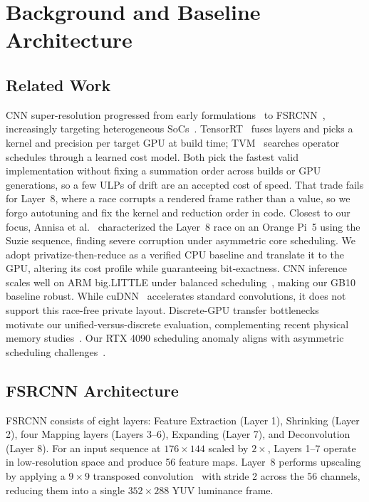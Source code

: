 \documentclass[conference]{IEEEtran}
\begin{document}
\section{Background and Baseline Architecture}

\subsection{Related Work}
CNN super-resolution progressed from early formulations~\cite{dong2014srcnn} to FSRCNN~\cite{dong2016fsrcnn}, increasingly targeting heterogeneous SoCs~\cite{nvidiagracehopper2022,wahlgren2025upm}. TensorRT~\cite{nvidiatensorrt} fuses layers and picks a kernel and precision per target GPU at build time; TVM~\cite{chen2018tvm} searches operator schedules through a learned cost model. Both pick the fastest valid implementation without fixing a summation order across builds or GPU generations, so a few ULPs of drift are an accepted cost of speed. That trade fails for Layer~8, where a race corrupts a rendered frame rather than a value, so we forgo autotuning and fix the kernel and reduction order in code. Closest to our focus, Annisa et al.~\cite{annisa2025} characterized the Layer~8 race on an Orange Pi~5 using the Suzie sequence, finding severe corruption under asymmetric core scheduling. We adopt privatize-then-reduce as a verified CPU baseline and translate it to the GPU, altering its cost profile while guaranteeing bit-exactness. CNN inference scales well on ARM big.LITTLE under balanced scheduling~\cite{wang2020pipeit}, making our GB10 baseline robust. While cuDNN~\cite{chetlur2014cudnn} accelerates standard convolutions, it does not support this race-free private layout. Discrete-GPU transfer bottlenecks~\cite{go2017apunet} motivate our unified-versus-discrete evaluation, complementing recent physical memory studies~\cite{wahlgren2025upm}. Our RTX 4090 scheduling anomaly aligns with asymmetric scheduling challenges~\cite{bilbao2023pmcsched,eichenberger2012ompaffinity}.

\subsection{FSRCNN Architecture}
FSRCNN consists of eight layers: Feature Extraction (Layer 1), Shrinking (Layer 2), four Mapping layers (Layers 3--6), Expanding (Layer 7), and Deconvolution (Layer 8). For an input sequence at $176{\times}144$ scaled by $2\times$, Layers 1--7 operate in low-resolution space and produce 56 feature maps. Layer~8 performs upscaling by applying a $9{\times}9$ transposed convolution~\cite{dumoulin2016convolution} with stride 2 across the 56 channels, reducing them into a single $352{\times}288$ YUV luminance frame.
\end{document}
